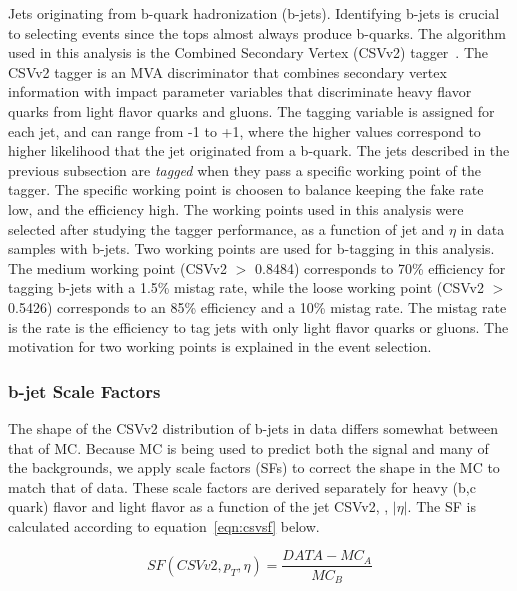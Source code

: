 Jets originating from b-quark hadronization (b-jets). Identifying b-jets is crucial to selecting \tth events since the tops
almost always produce b-quarks. The algorithm used in this analysis is the Combined Secondary Vertex (CSVv2) tagger~\cite{csvv2}. The CSVv2 tagger is an MVA discriminator that
combines secondary vertex information with impact parameter variables that discriminate heavy flavor quarks from light flavor quarks and gluons. The tagging variable is assigned
for each jet, and can range from -1 to +1, where the higher values correspond to higher likelihood that the jet originated from a b-quark. The jets described in the previous
subsection are \emph{tagged} when they pass a specific working point of the tagger. The specific working point is choosen to balance keeping the fake rate low, and the efficiency
high. The working points used in this analysis were selected after studying the tagger performance, as a function of jet \pt and $\eta$ in data samples with b-jets. Two working points
are used for b-tagging in this analysis. The medium working point (CSVv2 $>$ 0.8484) corresponds to 70\% efficiency for tagging
b-jets with a 1.5\% mistag rate, while the loose working point (CSVv2 $>$ 0.5426) corresponds to an 85\% efficiency and a 10\% mistag rate. The mistag rate is the rate is the efficiency
to tag jets with only light flavor quarks or gluons. The motivation for two working points is explained in the event selection. 

\subsubsection{b-jet Scale Factors}
The shape of the CSVv2 distribution of b-jets in data differs somewhat between that of MC. Because MC is being used to predict both the signal and many of the backgrounds, we apply scale factors (SFs)
to correct the shape in the MC to match that of data. These scale factors are derived separately for heavy (b,c quark) flavor and light flavor as a function of the jet CSVv2, \pt, $|\eta|$. The SF is 
calculated according to equation~\ref{eqn:csvsf} below. 

\begin{equation}
\label{eqn:csvsf}
  SF(CSVv2,p_{T},\eta) = \frac{DATA-MC_{A}}{MC_{B}}
\end{equation}

